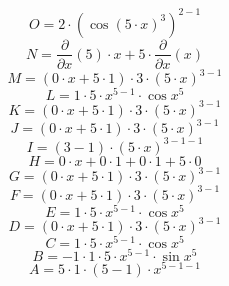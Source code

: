 \documentclass[12pt]{article}
\begin{document}
\begin{equation}
	O = 
2\cdot \left( \cos {\left( 5\cdot x\right) ^{3}}\right) ^{2 - 1}
\end{equation}
\begin{equation}
	N = 
\frac{\partial}{\partial x}\left( 5\right) \cdot x + 5\cdot \frac{\partial}{\partial x}\left( x\right) 
\end{equation}
\begin{equation}
	M = 
\left( 0\cdot x + 5\cdot 1\right) \cdot 3\cdot \left( 5\cdot x\right) ^{3 - 1}
\end{equation}
\begin{equation}
	L = 
1\cdot 5\cdot x^{5 - 1}\cdot \cos {x^{5}}
\end{equation}
\begin{equation}
	K = 
\left( 0\cdot x + 5\cdot 1\right) \cdot 3\cdot \left( 5\cdot x\right) ^{3 - 1}
\end{equation}
\begin{equation}
	J = 
\left( 0\cdot x + 5\cdot 1\right) \cdot 3\cdot \left( 5\cdot x\right) ^{3 - 1}
\end{equation}
\begin{equation}
	I = 
\left( 3 - 1\right) \cdot \left( 5\cdot x\right) ^{3 - 1 - 1}
\end{equation}
\begin{equation}
	H = 
0\cdot x + 0\cdot 1 + 0\cdot 1 + 5\cdot 0
\end{equation}
\begin{equation}
	G = 
\left( 0\cdot x + 5\cdot 1\right) \cdot 3\cdot \left( 5\cdot x\right) ^{3 - 1}
\end{equation}
\begin{equation}
	F = 
\left( 0\cdot x + 5\cdot 1\right) \cdot 3\cdot \left( 5\cdot x\right) ^{3 - 1}
\end{equation}
\begin{equation}
	E = 
1\cdot 5\cdot x^{5 - 1}\cdot \cos {x^{5}}
\end{equation}
\begin{equation}
	D = 
\left( 0\cdot x + 5\cdot 1\right) \cdot 3\cdot \left( 5\cdot x\right) ^{3 - 1}
\end{equation}
\begin{equation}
	C = 
1\cdot 5\cdot x^{5 - 1}\cdot \cos {x^{5}}
\end{equation}
\begin{equation}
	B = 
-1\cdot 1\cdot 5\cdot x^{5 - 1}\cdot \sin {x^{5}}
\end{equation}
\begin{equation}
	A = 
5\cdot 1\cdot \left( 5 - 1\right) \cdot x^{5 - 1 - 1}
\end{equation}
\end{document}
